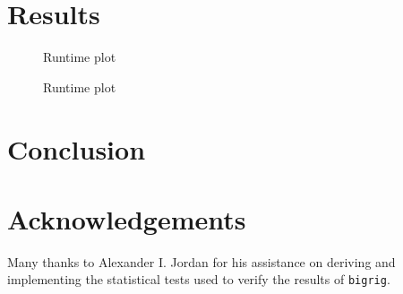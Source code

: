 \documentclass[a4paper]{article}
\newcommand{\bigrig}{\texttt{bigrig}}
\begin{document}
\section{Results}

\begin{figure}
    \centering
    
    \caption{Runtime plot}\label{fig:runtime-taxa}
\end{figure}

\begin{figure}
    \centering
    
    \caption{Runtime plot}\label{fig:runtime-regions}
\end{figure}

\section{Conclusion}

\section{Acknowledgements}

Many thanks to Alexander I. Jordan for his assistance on deriving and
implementing the statistical tests used to verify the results of \bigrig{}.


\end{document}
